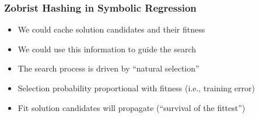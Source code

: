 \documentclass[lualatex,professionalfonts,aspectratio=169,usepdftitle=false,xcolor={dvipsnames}]{beamer}
\begin{document}
\begin{frame}
    \frametitle{Zobrist Hashing in Symbolic Regression}

    \begin{itemize}
        \item We could cache solution candidates and their fitness
        \item We could use this information to guide the search
    \end{itemize}
    \bigskip

    \begin{itemize}
        \item The search process is driven by ``natural selection''
        \item Selection probability proportional with fitness (i.e., training error)
        \item Fit solution candidates will propagate (``survival of the fittest'')
    \end{itemize}
\end{frame}
\end{document}
